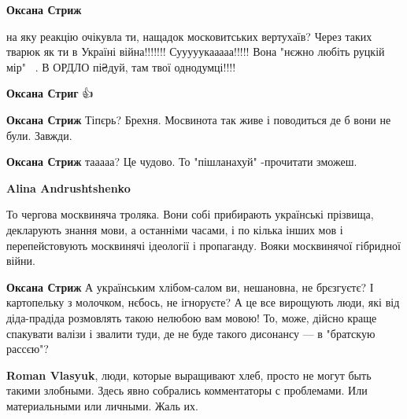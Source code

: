 \begin{itemize}
\begin{itemize}
\textbf{Оксана Стриж} 

на яку реакцію очікувла ти, нащадок московитських вертухаїв? Через таких тварюк
як ти в Україні війна!!!!!!!  Сууууукааааа!!!!! Вона "нєжно любіть руцкій
мір"🤬🤬🤬. В ОРДЛО пі₴дуй, там твої однодумці!!!!

 
\textbf{Оксана Стриг} 👍

 
\textbf{Оксана Стриж} Тіпєрь? Брехня. Мосвинота так живе і поводиться де б вони не були. Завжди.

 
\textbf{Оксана Стриж} тааааа? Це чудово. То "пішланахуй" -прочитати зможеш.

 
\textbf{Alina Andrushtshenko} 

То чергова москвиняча троляка. Вони собі прибирають українські прізвища,
декларують знання мови, а останніми часами, і по кілька інших мов і
перепейстовують москвинячі ідеології і пропаганду. Вояки москвинячої гібридної
війни.

 
\textbf{Оксана Стриж} А українським хлібом-салом ви, нешановна, не брєзгуєтє? І картопельку з молочком, нєбось, не ігноруєте? А це все вирощують люди, які від діда-прадіда розмовлять такою нелюбою вам мовою! То, може, дійсно краще спакувати валізи і звалити туди, де не буде такого дисонансу — в "братскую рассєю"?

 
\textbf{Roman Vlasyuk}, люди, которые выращивают хлеб, просто не могут быть такими злобными. \Smiley[1.0][yellow] Здесь явно собрались комментаторы с проблемами. Или материальными или личными. Жаль их.


\end{itemize}
\end{itemize}
